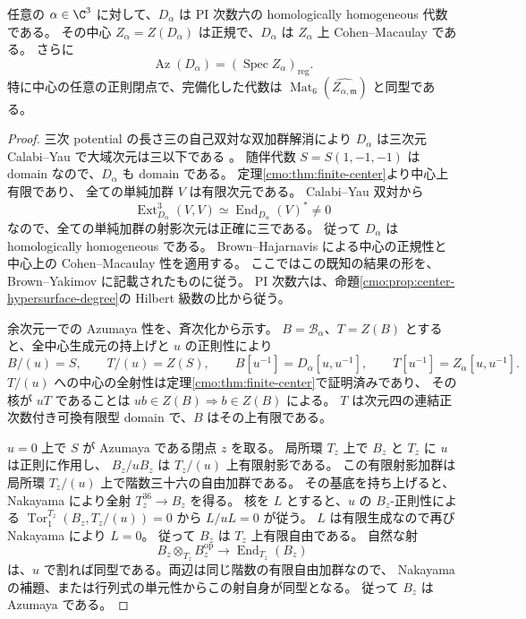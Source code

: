 \begin{theorem}
\label{cmo:thm:azumaya-regular}
任意の $\alpha\in\C^3$ に対して、$D_\alpha$ は PI 次数六の
homologically homogeneous 代数である。
その中心 $Z_\alpha=Z(D_\alpha)$ は正規で、$D_\alpha$ は
$Z_\alpha$ 上 Cohen--Macaulay である。
さらに
\[
 \operatorname{Az}(D_\alpha)=
       (\operatorname{Spec} Z_\alpha)_{\mathrm{reg}}.
\]
特に中心の任意の正則閉点で、完備化した代数は
$\operatorname{Mat}_6(\widehat{Z_{\alpha,\mathfrak m}})$ と同型である。
\end{theorem}
\begin{proof}
三次 potential の長さ三の自己双対な双加群解消により
$D_\alpha$ は三次元 Calabi--Yau で大域次元は三以下である
\cite[Theorem~3.3.2]{NFMEG}。
随伴代数 $S=S(1,-1,-1)$ は domain なので、$D_\alpha$ も domain である。
定理\ref{cmo:thm:finite-center}より中心上有限であり、
全ての単純加群 $V$ は有限次元である。
Calabi--Yau 双対から
\[
 \operatorname{Ext}_{D_\alpha}^3(V,V)
       \simeq\operatorname{End}_{D_\alpha}(V)^*\ne0
\]
なので、全ての単純加群の射影次元は正確に三である。
従って $D_\alpha$ は homologically homogeneous である。
Brown--Hajarnavis による中心の正規性と中心上の Cohen--Macaulay 性を適用する。
ここではこの既知の結果の形を、
Brown--Yakimov \cite[\S3.8(b)(i), Proposition~3.10 and its proof]{CMOBrownYakimov}
に記載されたものに従う。
PI 次数六は、命題\ref{cmo:prop:center-hypersurface-degree}の Hilbert 級数の比から従う。

余次元一での Azumaya 性を、斉次化から示す。
$B=\mathcal B_\alpha$、$T=Z(B)$ とすると、全中心生成元の持上げと
$u$ の正則性により
\[
 B/(u)=S,\qquad T/(u)=Z(S),\qquad
 B[u^{-1}]=D_\alpha[u,u^{-1}],\qquad
 T[u^{-1}]=Z_\alpha[u,u^{-1}].
\]
$T/(u)$ への中心の全射性は定理\ref{cmo:thm:finite-center}で証明済みであり、
その核が $uT$ であることは $ub\in Z(B)\Rightarrow b\in Z(B)$ による。
$T$ は次元四の連結正次数付き可換有限型 domain で、$B$ はその上有限である。

$u=0$ 上で $S$ が Azumaya である閉点 $z$ を取る。
局所環 $T_z$ 上で $B_z$ と $T_z$ に $u$ は正則に作用し、
$B_z/uB_z$ は $T_z/(u)$ 上有限射影である。
この有限射影加群は局所環 $T_z/(u)$ 上で階数三十六の自由加群である。
その基底を持ち上げると、Nakayama により全射 $T_z^{36}\to B_z$ を得る。
核を $L$ とすると、$u$ の $B_z$-正則性による
$\operatorname{Tor}_1^{T_z}(B_z,T_z/(u))=0$ から $L/uL=0$ が従う。
$L$ は有限生成なので再び Nakayama により $L=0$。
従って $B_z$ は $T_z$ 上有限自由である。
自然な射
\[
 B_z\otimes_{T_z}B_z^{\mathrm{op}}
       \longrightarrow\operatorname{End}_{T_z}(B_z)
\]
は、$u$ で割れば同型である。両辺は同じ階数の有限自由加群なので、
Nakayama の補題、または行列式の単元性からこの射自身が同型となる。
従って $B_z$ は Azumaya である。


\end{proof}
